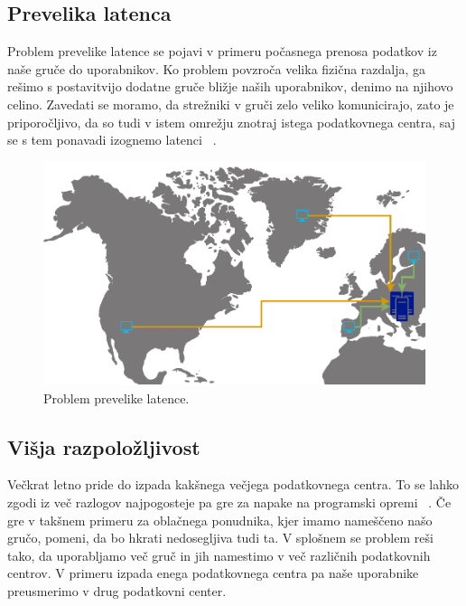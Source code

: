 \documentclass[a4paper, 12pt]{book}
\begin{document}
\subsection{Prevelika latenca}
Problem prevelike latence se pojavi v primeru počasnega prenosa podatkov iz naše gruče do uporabnikov.
Ko problem povzroča velika fizična razdalja, ga rešimo s postavitvijo dodatne gruče bližje naših uporabnikov, denimo na njihovo celino.
Zavedati se moramo, da strežniki v gruči zelo veliko komunicirajo, zato je priporočljivo, da so tudi v istem omrežju znotraj istega podatkovnega centra, saj se s tem ponavadi izognemo latenci ~\cite{kube-and-edge}.
\begin{figure}[h]
\begin{center}
  \includegraphics[width=1.0\textwidth]{images/problem-prevelike-latence.pdf}
\end{center}
\caption{Problem prevelike latence.}
\label{problem-prevelike-latence}
\end{figure}
\subsection{Višja razpoložljivost}
Večkrat letno pride do izpada kakšnega večjega podatkovnega centra. 
To se lahko zgodi iz več razlogov najpogosteje pa gre za napake na programski opremi ~\cite{common-outages}.
Če gre v takšnem primeru za oblačnega ponudnika, kjer imamo nameščeno našo gručo, pomeni, da bo hkrati nedosegljiva tudi ta.
V splošnem se problem reši tako, da uporabljamo več gruč in jih namestimo v več različnih podatkovnih centrov.
V primeru izpada enega podatkovnega centra pa naše uporabnike preusmerimo v drug podatkovni center.
\end{document}
